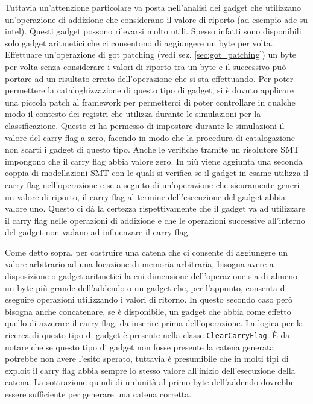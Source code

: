 Tuttavia un'attenzione particolare va posta nell'analisi dei gadget
che utilizzano un'operazione di addizione che considerano il valore di
riporto (ad esempio adc su intel). Questi gadget possono rilevarsi
molto utili. Spesso infatti sono disponibili solo gadget aritmetici
che ci consentono di aggiungere un byte per volta. Effettuare
un'operazione di got patching (vedi sez. \ref{sec:got_patching}) un
byte per volta senza considerare i valori di riporto tra un byte e il
successivo può portare ad un risultato errato dell'operazione che si
sta effettuando. Per poter permettere la cataloghizzazione di questo
tipo di gadget, si è dovuto applicare una piccola patch al framework
per permetterci di poter controllare in qualche modo il contesto dei
registri che utilizza durante le simulazioni per la
classificazione. Questo ci ha permesso di impostare durante le
simulazioni il valore del carry flag a zero, facendo in modo che la
procedura di catalogazione non scarti i gadget di questo tipo. Anche
le verifiche tramite un risolutore SMT impongono che il carry flag
abbia valore zero. In più viene aggiunta una seconda coppia di
modellazioni SMT con le quali si verifica se il gadget in esame
utilizza il carry flag nell'operazione e se a seguito di un'operazione
che sicuramente generi un valore di riporto, il carry flag al termine
dell'esecuzione del gadget abbia valore uno. Questo ci dà la certezza
rispettivamente che il gadget va ad utilizzare il carry flag nelle
operazioni di addizione e che le operazioni successive all'interno del
gadget non vadano ad influenzare il carry flag.

Come detto sopra, per costruire una catena che ci consente di
aggiungere un valore arbitrario ad una locazione di memoria
arbitraria, bisogna avere a disposizione o gadget aritmetici la cui
dimensione dell'operazione sia di almeno un byte più grande
dell'addendo o un gadget che, per l'appunto, consenta di eseguire
operazioni utilizzando i valori di ritorno. In questo secondo caso
però bisogna anche concatenare, se è disponibile, un gadget che abbia
come effetto quello di azzerare il carry flag, da inserire prima
dell'operazione. La logica per la ricerca di questo tipo di gadget è
presente nella classe \lstinline{ClearCarryFlag}. È da notare che se
questo tipo di gadget non fosse presente la catena generata potrebbe
non avere l'esito sperato, tuttavia è presumibile che in molti tipi di
exploit il carry flag abbia sempre lo stesso valore all'inizio
dell'esecuzione della catena. La sottrazione quindi di un'unità al
primo byte dell'addendo dovrebbe essere sufficiente per generare una
catena corretta. 

